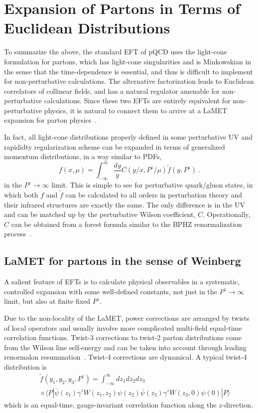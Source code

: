 \documentclass[prd,aps,twocolumn,preprintnumbers,showpacs,nofootinbib,superscriptaddress,notitlepage]{revtex4-1}
\begin{document}
\section{Expansion of Partons in Terms of Euclidean Distributions}

To summarize the above, the standard EFT of pQCD uses the light-cone formulation for partons, which has light-cone singularities and is Minkowskian in the sense that the time-dependence is essential,
and thus is difficult to implement for non-perturbative calculations. The alternative factorization leads to Euclidean correlators of collinear fields, and has a natural regulator amenable for non-perturbative calculations. Since these two EFTs are entirely equivalent for non-perturbative physics, it is natural to connect them to arrive at a LaMET expansion for parton physics~\cite{Ji:2013dva}. 

In fact, all light-cone distributions
properly defined in some perturbative UV and rapididty regularization scheme 
can be expanded in terms of generalized momentum distributions, in a way similar to PDFs, 
\begin{equation}
  f(x, \mu) = \int^\infty_{-\infty} \frac{dy}{y} C(y/x, P^z/\mu)\tilde f(y, P^z)  \ .  
\end{equation}
in the $P^z\to \infty$ limit. 
This is simple to see for perturbative quark/gluon states, in which both $f$ and $\tilde f$ can be calculated to all orders in perturbation theory and their infrared structures are exactly the same. The only difference is in the UV and can be matched up by the perturbative Wilson coefficient, $C$. Operationally, $C$ can be obtained from a forest formula similar to the BPHZ renormalization process~\cite{Itzykson:1980rh,Zimmermann:1969jj}. 

\subsection{LaMET for partons in the sense of Weinberg}

A salient feature of EFTs is to calculate physical observables in a systematic, controlled expansion with some well-defined constants, not just in the $P^z\to \infty$ limit, but also at finite fixed $P^z$.

Due to the non-locality of the LaMET,
power corrections are arranged by twists of local operators and usually involve more complicated 
multi-field equal-time correlation functions. Twist-3 corrections to twist-2 parton distributions come from 
the Wilson line self-energy and can be taken into account through leading renormalon resummation~\cite{Zhang:2023bxs}. Twist-4 corrections are
dynamical. A typical twist-4 distribution is~\cite{Chen:2016utp} 
\begin{eqnarray}
   && \tilde f(y_1,y_2,y_3, P^z) 
   = \int^\infty_{-\infty} dz_1 dz_2 dz_3 \\ 
  && \times  \langle P|\overline{\psi}(z_1) 
   \gamma^z W(z_1,z_2) \psi(z_2)\overline{\psi}(z_3)  \gamma^z W(z_3, 0)\psi(0)|P\rangle \nonumber 
\end{eqnarray}
which is an equal-time, gauge-invariant correlation function along the $z$-direction. 
\end{document}
